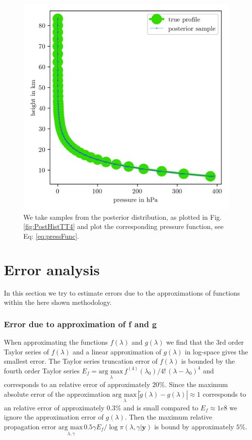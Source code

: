 \begin{figure}[ht!]
	\centering
	\includegraphics{PressPostMeanSigm.png}
	\caption[Pressure posterior samples.]{We take samples from the posterior distribution, as plotted in Fig. \ref{fig:PostHistTT4} and plot the corresponding pressure function, see Eq: \ref{eq:pressFunc}.}
	\label{fig:PressPost}
\end{figure}

\section{Error analysis}
In this section we try to estimate errors due to the approximations of functions within the here shown methodology.

\subsubsection{Error due to approximation of f and g}
When approximating the functions $f(\lambda)$ and $g(\lambda)$ we find that the 3rd order Taylor series of $f(\lambda)$ and a linear approximation of $g(\lambda)$ in log-space gives the smallest error.
The Taylor series truncation error of $f(\lambda)$ is bounded by the fourth order Taylor series $E_f = \underset{\lambda}{\text{arg max}\,} f^{(4)}(\lambda_0)/ 4! \, (\lambda - \lambda_{0} )^4$ and corresponds to an relative error of approximately $20\%$.
Since the maximum absolute error of the approximation $\underset{\lambda}{\text{arg max}\,}|\tilde{g}(\lambda) - g(\lambda) | \approx 1$ corresponds to an relative error of approximately $0.3\%$ and is small compared to $E_f \approx 1e8$ we ignore the approximation error of $g(\lambda)$.
Then the maximum relative propagation error $\underset{\lambda, \gamma}{\text{arg max}\,} 0.5 \gamma  E_f / \log{\pi{(\lambda ,\gamma | \bm{y})}} $ is bound by approximately $5\%$.

